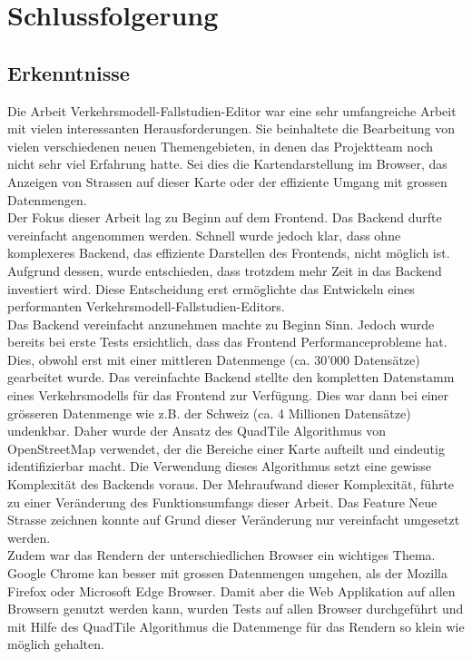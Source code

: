\chapter{Schlussfolgerung}
\section{Erkenntnisse}
Die Arbeit \glqq{}Verkehrsmodell-Fallstudien-Editor\grqq{} war eine sehr umfangreiche Arbeit mit vielen interessanten Herausforderungen. Sie beinhaltete die Bearbeitung von vielen verschiedenen neuen Themengebieten, in denen das Projektteam noch nicht sehr viel Erfahrung hatte. Sei dies die Kartendarstellung im Browser, das Anzeigen von Strassen auf dieser Karte oder der effiziente Umgang mit grossen Datenmengen.\\
Der Fokus dieser Arbeit lag zu Beginn auf dem Frontend. Das Backend durfte vereinfacht angenommen werden. Schnell wurde jedoch klar, dass ohne komplexeres Backend, das effiziente Darstellen des Frontends, nicht möglich ist. Aufgrund dessen, wurde entschieden, dass trotzdem mehr Zeit in das Backend investiert wird. Diese Entscheidung erst ermöglichte das Entwickeln eines performanten Verkehrsmodell-Fallstudien-Editors.\\
Das Backend vereinfacht anzunehmen machte zu Beginn Sinn. Jedoch wurde bereits bei erste Tests ersichtlich, dass das Frontend Performanceprobleme hat. Dies, obwohl erst mit einer mittleren Datenmenge (ca. 30'000 Datensätze) gearbeitet wurde. Das vereinfachte Backend stellte den kompletten Datenstamm eines Verkehrsmodells für das Frontend zur Verfügung. Dies war dann bei einer grösseren Datenmenge wie z.B. der Schweiz (ca. 4 Millionen Datensätze) undenkbar. Daher wurde der Ansatz des QuadTile Algorithmus von OpenStreetMap \cite{OSMQuadTiles} verwendet, der die Bereiche einer Karte aufteilt und eindeutig identifizierbar macht. Die Verwendung dieses Algorithmus setzt eine gewisse Komplexität des Backends voraus. Der Mehraufwand dieser Komplexität, führte zu einer Veränderung des Funktionsumfangs dieser Arbeit. Das Feature \glqq{}Neue Strasse zeichnen\grqq{} konnte auf Grund dieser Veränderung nur vereinfacht umgesetzt werden.\\
Zudem war das Rendern der unterschiedlichen Browser ein wichtiges Thema. Google Chrome kan besser mit grossen Datenmengen umgehen, als der Mozilla Firefox oder Microsoft Edge Browser. Damit aber die Web Applikation auf allen Browsern genutzt werden kann, wurden Tests auf allen Browser durchgeführt und mit Hilfe des QuadTile Algorithmus die Datenmenge für das Rendern so klein wie möglich gehalten.\\
